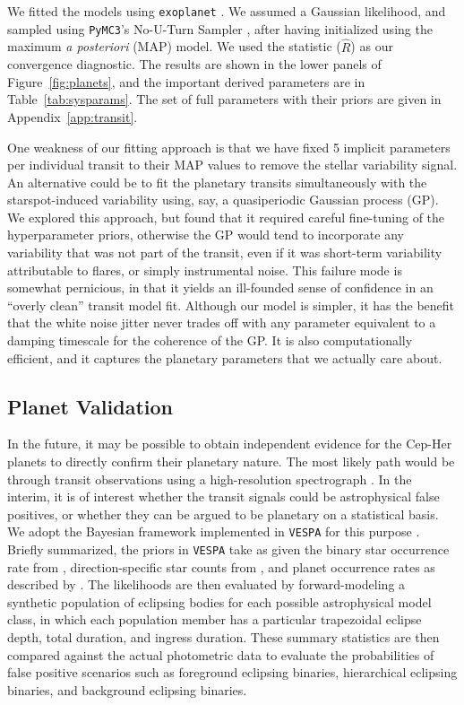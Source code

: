 \documentclass[12pt,twocolumn,linenumbers]{aastex63}
\begin{document}
We fitted the models using \texttt{exoplanet}
\citep{exoplanet:exoplanet}.  We assumed a Gaussian likelihood, and
sampled using \texttt{PyMC3}'s No-U-Turn Sampler
\citep{hoffman_no-u-turn_2014}, after having initialized using the
maximum {\it a posteriori} (MAP) model.  We used the
\citet{gelman_inference_1992} statistic ($\hat{R}$) as our convergence
diagnostic.  The results are shown in the lower panels of
Figure~\ref{fig:planets}, and the important derived parameters are in
Table~\ref{tab:sysparams}.  The set of full parameters with their
priors are given in Appendix~\ref{app:transit}.

One weakness of our fitting approach is that we have fixed 5 implicit
parameters per individual transit to their MAP values to remove the
stellar variability signal.  An alternative could be to fit the
planetary transits simultaneously with the starspot-induced
variability using, say, a quasiperiodic Gaussian process (GP).  We
explored this approach, but found that it required careful fine-tuning
of the hyperparameter priors, otherwise the GP would tend to
incorporate any variability that was not part of the transit, even if it was
short-term variability attributable to flares, or simply
instrumental noise.  This failure mode is somewhat pernicious, in that
it yields an ill-founded sense of confidence in an ``overly clean''
transit model fit.  Although our model is simpler, it has the benefit
that the white noise jitter never trades off with any parameter
equivalent to a damping timescale for the coherence of the GP.  It is
also computationally efficient, and it captures the planetary
parameters that we actually care about.


\subsection{Planet Validation}

In the future, it may be possible to obtain independent evidence for
the Cep-Her planets to directly confirm their planetary nature.  The
most likely path would be through transit observations using a
high-resolution spectrograph \citep[see][]{bouma_kep1627_2022}.  In
the interim, it is of interest whether the transit signals could be
astrophysical false positives, or whether they can be argued to be
planetary on a statistical basis.  We adopt the Bayesian framework
implemented in \texttt{VESPA} for this purpose
\citep{morton_efficient_2012,vespa_2015}.  Briefly summarized, the
priors in \texttt{VESPA} take as given the binary star occurrence rate
from \citet{raghavan_survey_2010}, direction-specific star counts from
\citet{girardi_star_2005}, and planet occurrence rates as described by
\citet[][Section~3.4]{morton_efficient_2012}.  The likelihoods are
then evaluated by forward-modeling a synthetic population of eclipsing
bodies for each possible astrophysical model class, in which each
population member has a particular trapezoidal eclipse depth, total
duration, and ingress duration.  These summary statistics are then
compared against the actual photometric data to evaluate the
probabilities of false positive scenarios such as foreground eclipsing
binaries, hierarchical eclipsing binaries, and background eclipsing
binaries.
\end{document}
